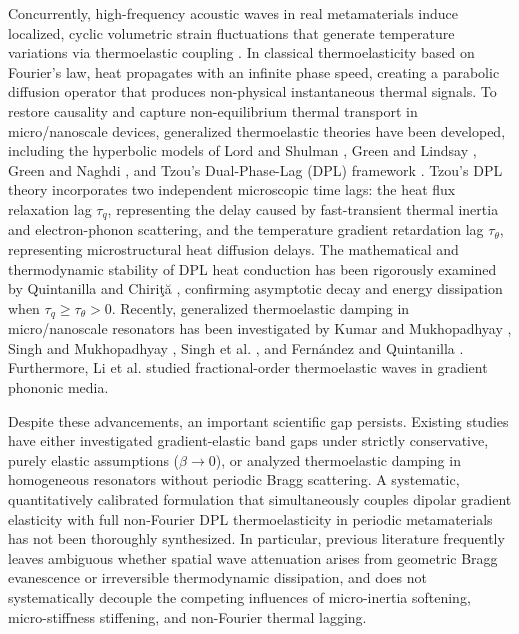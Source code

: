 \documentclass[11pt,a4paper]{article}
\begin{document}
Concurrently, high-frequency acoustic waves in real metamaterials induce localized, cyclic volumetric strain fluctuations that generate temperature variations via thermoelastic coupling \cite{biot1956thermoelasticity}. In classical thermoelasticity based on Fourier's law, heat propagates with an infinite phase speed, creating a parabolic diffusion operator that produces non-physical instantaneous thermal signals. To restore causality and capture non-equilibrium thermal transport in micro/nanoscale devices, generalized thermoelastic theories have been developed, including the hyperbolic models of Lord and Shulman \cite{lord1967generalized}, Green and Lindsay \cite{green1972thermoelasticity}, Green and Naghdi \cite{green1991reexamination}, and Tzou's Dual-Phase-Lag (DPL) framework \cite{tzou1995unified,tzou2014macro,chandrasekharaiah1998hyperbolic}. Tzou's DPL theory incorporates two independent microscopic time lags: the heat flux relaxation lag $\tau_q$, representing the delay caused by fast-transient thermal inertia and electron-phonon scattering, and the temperature gradient retardation lag $\tau_\theta$, representing microstructural heat diffusion delays. The mathematical and thermodynamic stability of DPL heat conduction has been rigorously examined by Quintanilla \cite{quintanilla2002damped} and Chiri\c{t}\u{a} \cite{chirita2017time}, confirming asymptotic decay and energy dissipation when $\tau_q \ge \tau_\theta > 0$. Recently, generalized thermoelastic damping in micro/nanoscale resonators has been investigated by Kumar and Mukhopadhyay \cite{kumar2022surface}, Singh and Mukhopadhyay \cite{singh2021galerkin}, Singh et al. \cite{singh2022analytical}, and Fern\'andez and Quintanilla \cite{fernandez2021moore}. Furthermore, Li et al. \cite{li2023thermoelastic} studied fractional-order thermoelastic waves in gradient phononic media.

Despite these advancements, an important scientific gap persists. Existing studies have either investigated gradient-elastic band gaps under strictly conservative, purely elastic assumptions ($\beta \to 0$), or analyzed thermoelastic damping in homogeneous resonators without periodic Bragg scattering. A systematic, quantitatively calibrated formulation that simultaneously couples dipolar gradient elasticity with full non-Fourier DPL thermoelasticity in periodic metamaterials has not been thoroughly synthesized. In particular, previous literature frequently leaves ambiguous whether spatial wave attenuation arises from geometric Bragg evanescence or irreversible thermodynamic dissipation, and does not systematically decouple the competing influences of micro-inertia softening, micro-stiffness stiffening, and non-Fourier thermal lagging.
\end{document}
